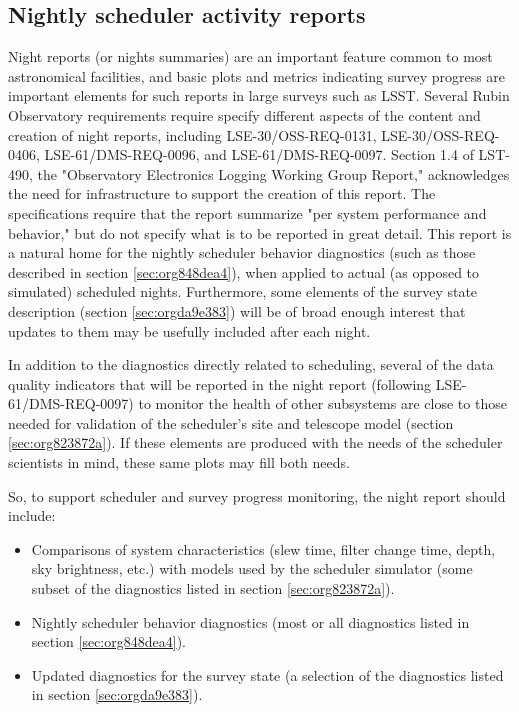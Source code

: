 \subsection{Nightly scheduler activity reports}
\label{sec:org958806d}
Night reports (or nights summaries) are an important feature common to most astronomical facilities, and basic plots and metrics indicating survey progress are important elements for such reports in large surveys such as LSST.
Several Rubin Observatory requirements require specify different aspects of the content and creation of night reports, including LSE-30/OSS-REQ-0131, LSE-30/OSS-REQ-0406, LSE-61/DMS-REQ-0096, and LSE-61/DMS-REQ-0097. Section 1.4 of LST-490, the "Observatory Electronics Logging Working Group Report," acknowledges the need for infrastructure to support the creation of this report.
The specifications require that the report summarize "per system performance and behavior," but do not specify what is to be reported in great detail.
This report is a natural home for the nightly scheduler behavior diagnostics (such as those described in section \ref{sec:org848dea4}), when applied to actual (as opposed to simulated) scheduled nights.
Furthermore, some elements of the survey state description (section \ref{sec:orgda9e383}) will be of broad enough interest that updates to them may be usefully included after each night.

In addition to the diagnostics directly related to scheduling, several of the data quality indicators that will be reported in the night report (following LSE-61/DMS-REQ-0097) to monitor the health of other subsystems are close to those needed for validation of the scheduler's site and telescope model (section \ref{sec:org823872a}). If these elements are produced with the needs of the scheduler scientists in mind, these same plots may fill both needs.

So, to support scheduler and survey progress monitoring, the night report should include:
\begin{itemize}
\item Comparisons of system characteristics (slew time, filter change time, depth, sky brightness, etc.) with models used by the scheduler simulator (some subset of the diagnostics listed in section \ref{sec:org823872a}).
\item Nightly scheduler behavior diagnostics (most or all diagnostics listed in section \ref{sec:org848dea4}).
\item Updated diagnostics for the survey state (a selection of the diagnostics listed in section \ref{sec:orgda9e383}).
\end{itemize}

